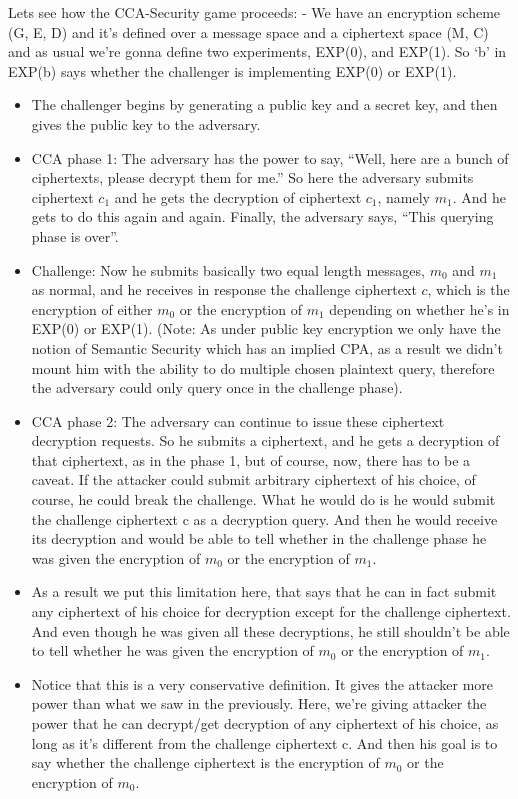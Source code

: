 \documentclass[11pt]{article}
\begin{document}
Lets see how the CCA-Security game proceeds: - We have an encryption
scheme (G, E, D) and it's defined over a message space and a ciphertext
space (M, C) and as usual we're gonna define two experiments, EXP(0),
and EXP(1). So `b' in EXP(b) says whether the challenger is implementing
EXP(0) or EXP(1).

\begin{itemize}
\item
  The challenger begins by generating a public key and a secret key, and
  then gives the public key to the adversary. 
\item
  CCA phase 1: The adversary has the power to say, ``Well, here are a
  bunch of ciphertexts, please decrypt them for me.'' So here the
  adversary submits ciphertext \(c_{1}\) and he gets the decryption of
  ciphertext \(c_{1}\), namely \(m_{1}\). And he gets to do this again
  and again. Finally, the adversary says, ``This querying phase is
  over''.
\item
  Challenge: Now he submits basically two equal length messages,
  \(m_{0}\) and \(m_{1}\) as normal, and he receives in response the
  challenge ciphertext \(c\), which is the encryption of either
  \(m_{0}\) or the encryption of \(m_{1}\) depending on whether he's in
  EXP(0) or EXP(1). (Note: As under public key encryption we only have
  the notion of Semantic Security which has an implied CPA, as a result
  we didn't mount him with the ability to do multiple chosen plaintext
  query, therefore the adversary could only query once in the challenge
  phase).
\item
  CCA phase 2: The adversary can continue to issue these ciphertext
  decryption requests. So he submits a ciphertext, and he gets a
  decryption of that ciphertext, as in the phase 1, but of course, now,
  there has to be a caveat. If the attacker could submit arbitrary
  ciphertext of his choice, of course, he could break the challenge.
  What he would do is he would submit the challenge ciphertext c as a
  decryption query. And then he would receive its decryption and would
  be able to tell whether in the challenge phase he was given the
  encryption of \(m_{0}\) or the encryption of \(m_{1}\). 
\item
  As a result we put this limitation here, that says that he can in fact
  submit any ciphertext of his choice for decryption except for the
  challenge ciphertext. And even though he was given all these
  decryptions, he still shouldn't be able to tell whether he was given
  the encryption of \(m_{0}\) or the encryption of \(m_{1}\). 
\item
  Notice that this is a very conservative definition. It gives the
  attacker more power than what we saw in the previously. Here, we're
  giving attacker the power that he can decrypt/get decryption of any
  ciphertext of his choice, as long as it's different from the challenge
  ciphertext c. And then his goal is to say whether the challenge
  ciphertext is the encryption of \(m_{0}\) or the encryption of
  \(m_{0}\). 
\end{itemize}
\end{document}
